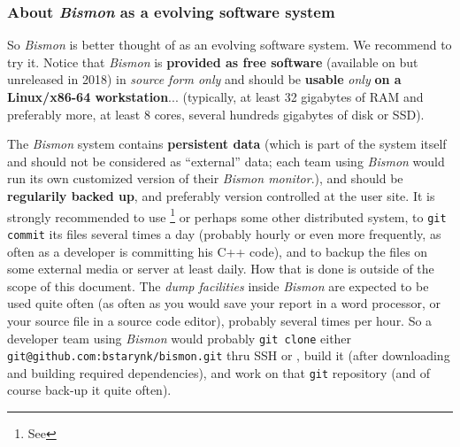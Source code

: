 \subsubsection{About \emph{Bismon} as a evolving software system}
\label{subsubsec:bismon-evolving}

So \emph{Bismon} is better thought of as an evolving software
system. We recommend to try it. Notice that \textit{Bismon} is
\textbf{provided as free software} (available
on  but unreleased in 2018) in \emph{source form only}
and should be \textbf{usable} \emph{only} \textbf{on a Linux/x86-64
  workstation}... (typically, at least 32 gigabytes of RAM and
preferably more, at least 8 cores, several hundreds gigabytes of disk
or SSD).

The \textit{Bismon} system contains \textbf{persistent data} (which is
part of the system itself and should not be considered as ``external''
data; each team using \textit{Bismon} would run its own customized
version of their \textit{Bismon monitor}.), and should be
\textbf{regularily backed up}, and preferably version controlled at
the user site. It is strongly recommended to use
 \footnote{See }
or perhaps some other distributed  system, to \texttt{git commit} its files several times a
day (probably hourly or even more frequently, as often as a developer
is committing his C++ code), and to backup the files on some external
media or server at least daily. How that is done is outside of the
scope of this document. The \emph{dump facilities} inside
\textit{Bismon} are expected to be used quite often (as often as you
would save your report in a word processor, or your source file in a
source code editor), probably several times per hour. So a developer
team using \textit{Bismon} would probably \texttt{git clone} either
\texttt{git@github.com:bstarynk/bismon.git} thru SSH or
, build it (after
downloading and building required dependencies), and work on that
\texttt{git} repository (and of course back-up it quite often).

